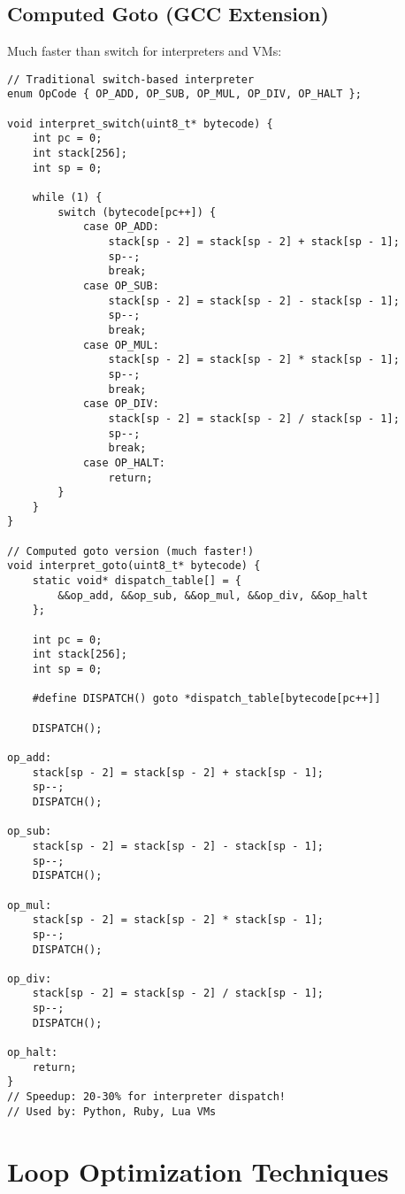\subsection{Computed Goto (GCC Extension)}

Much faster than switch for interpreters and VMs:

\begin{lstlisting}
// Traditional switch-based interpreter
enum OpCode { OP_ADD, OP_SUB, OP_MUL, OP_DIV, OP_HALT };

void interpret_switch(uint8_t* bytecode) {
    int pc = 0;
    int stack[256];
    int sp = 0;

    while (1) {
        switch (bytecode[pc++]) {
            case OP_ADD:
                stack[sp - 2] = stack[sp - 2] + stack[sp - 1];
                sp--;
                break;
            case OP_SUB:
                stack[sp - 2] = stack[sp - 2] - stack[sp - 1];
                sp--;
                break;
            case OP_MUL:
                stack[sp - 2] = stack[sp - 2] * stack[sp - 1];
                sp--;
                break;
            case OP_DIV:
                stack[sp - 2] = stack[sp - 2] / stack[sp - 1];
                sp--;
                break;
            case OP_HALT:
                return;
        }
    }
}

// Computed goto version (much faster!)
void interpret_goto(uint8_t* bytecode) {
    static void* dispatch_table[] = {
        &&op_add, &&op_sub, &&op_mul, &&op_div, &&op_halt
    };

    int pc = 0;
    int stack[256];
    int sp = 0;

    #define DISPATCH() goto *dispatch_table[bytecode[pc++]]

    DISPATCH();

op_add:
    stack[sp - 2] = stack[sp - 2] + stack[sp - 1];
    sp--;
    DISPATCH();

op_sub:
    stack[sp - 2] = stack[sp - 2] - stack[sp - 1];
    sp--;
    DISPATCH();

op_mul:
    stack[sp - 2] = stack[sp - 2] * stack[sp - 1];
    sp--;
    DISPATCH();

op_div:
    stack[sp - 2] = stack[sp - 2] / stack[sp - 1];
    sp--;
    DISPATCH();

op_halt:
    return;
}
// Speedup: 20-30% for interpreter dispatch!
// Used by: Python, Ruby, Lua VMs
\end{lstlisting}

\section{Loop Optimization Techniques}

